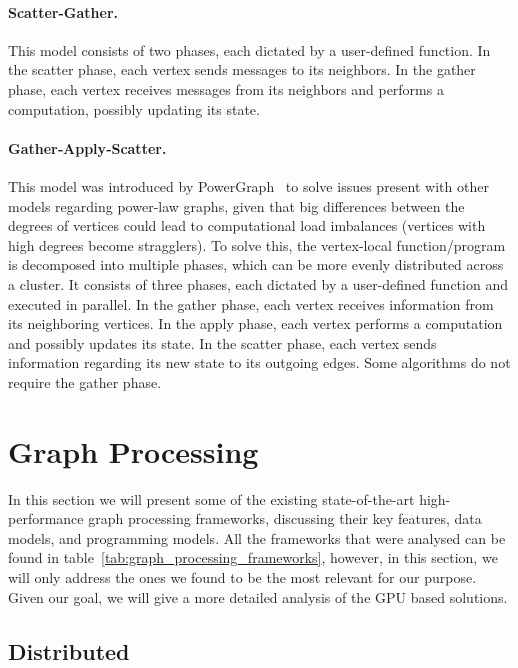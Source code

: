     \paragraph{\textbf{Scatter-Gather}.} This model consists of two phases, each dictated by a user-defined function. In the scatter phase, each vertex sends messages to its neighbors. In the gather phase, each vertex receives messages from its neighbors and performs a computation, possibly updating its state.
    
    \paragraph{\textbf{Gather‑Apply‑Scatter}.} This model was introduced by PowerGraph~\cite{paper:powergraph} to solve issues present with other models regarding power-law graphs, given that big differences between the degrees of vertices could lead to computational load imbalances (vertices with high degrees become stragglers). To solve this, the vertex-local function/program is decomposed into multiple phases, which can be more evenly distributed across a cluster. It consists of three phases, each dictated by a user-defined function and executed in parallel.  In the gather phase, each vertex receives information from its neighboring vertices. In the apply phase, each vertex performs a computation and possibly updates its state. In the scatter phase, each vertex sends information regarding its new state to its outgoing edges. Some algorithms do not require the gather phase.
    
    \section{Graph Processing}

    In this section we will present some of the existing state-of-the-art high-performance graph processing frameworks, discussing their key features, data models, and programming models. All the frameworks that were analysed can be found in table~\ref{tab:graph_processing_frameworks}, however, in this section, we will only address the ones we found to be the most relevant for our purpose. Given our goal, we will give a more detailed analysis of the \gls{GPU} based solutions.

    
    \subsection{Distributed}
    
